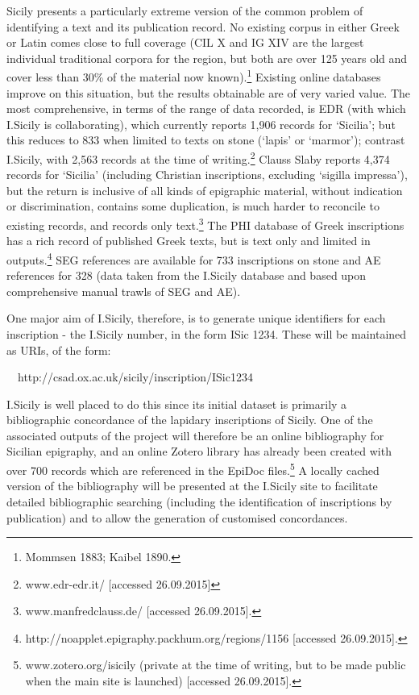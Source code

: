 \documentclass[amsthm,ebook]{saparticle}
\begin{document}
Sicily presents a particularly extreme version of the common problem of identifying a text and its publication record.
No existing corpus in either Greek or Latin comes close to full coverage (CIL X and IG XIV are the largest individual
traditional corpora for the region, but both are over 125 years old and cover less than 30\% of the material now
known).\footnote{ Mommsen 1883; Kaibel 1890.} Existing online databases improve on this situation, but the results
obtainable are of very varied value. The most comprehensive, in terms of the range of data recorded, is EDR (with which
I.Sicily is collaborating), which currently reports 1,906 records for ‘Sicilia’; but this reduces to 833 when limited
to texts on stone (‘lapis’ or ‘marmor’); contrast I.Sicily, with 2,563 records at the time of writing.\footnote{
www.edr-edr.it/ [accessed 26.09.2015]} Clauss Slaby reports 4,374 records for ‘Sicilia’ (including Christian
inscriptions, excluding ‘sigilla impressa’), but the return is inclusive of all kinds of epigraphic material, without
indication or discrimination, contains some duplication, is much harder to reconcile to existing records, and records
only text.\footnote{ www.manfredclauss.de/ [accessed 26.09.2015].} The PHI database of Greek inscriptions has a rich
record of published Greek texts, but is text only and limited in outputs.\footnote{
http://noapplet.epigraphy.packhum.org/regions/1156 [accessed 26.09.2015].} SEG references are available for 733
inscriptions on stone and AE references for 328 (data taken from the I.Sicily database and based upon comprehensive
manual trawls of SEG and AE).

One major aim of I.Sicily, therefore, is to generate unique identifiers for each inscription - the I.Sicily number, in
the form ISic 1234. These will be maintained as URIs, of the form:

\ \ http://csad.ox.ac.uk/sicily/inscription/ISic1234

I.Sicily is well placed to do this since its initial dataset is primarily a bibliographic concordance of the lapidary
inscriptions of Sicily. One of the associated outputs of the project will therefore be an online bibliography for
Sicilian epigraphy, and an online Zotero library has already been created with over 700 records which are referenced in
the EpiDoc files.\footnote{ www.zotero.org/isicily (private at the time of writing, but to be made public when the main
site is launched) [accessed 26.09.2015].} A locally cached version of the bibliography will be presented at the
I.Sicily site to facilitate detailed bibliographic searching (including the identification of inscriptions by
publication) and to allow the generation of customised concordances.
\end{document}
